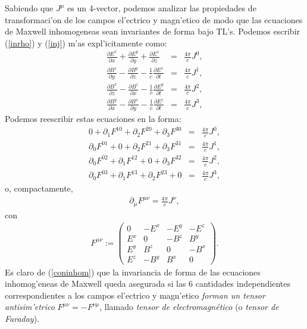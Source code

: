 Sabiendo que $J^\mu$ es un 4-vector, podemos analizar las propiedades de transformaci'on de los campos el'ectrico y magn'etico de modo que las ecuaciones de Maxwell inhomogeneas sean invariantes de forma bajo TL's. Podemos escribir (\ref{inrho}) y (\ref{inj})  m'as expl'icitamente
como:
\begin{eqnarray}
\frac{\partial E^x}{\partial x} + \frac{\partial E^y}{\partial y} +
\frac{\partial E^z}{\partial z} &=& \frac{4\pi}{c} J^0 , \\
\frac{\partial B^z}{\partial y} - \frac{\partial B^y}{\partial z} - \frac{1}{c}
\frac{\partial E^x}{\partial t} &=& \frac{4 \pi}{c} J^1 , \\
\frac{\partial B^x}{\partial z} - \frac{\partial B^z}{\partial x} - \frac{1}{c}
\frac{\partial E^y}{\partial t} &=& \frac{4 \pi}{c} J^2 , \\
\frac{\partial B^y}{\partial x} - \frac{\partial B^x}{\partial y} - \frac{1}{c}
\frac{\partial E^z}{\partial t} &=& \frac{4 \pi}{c} J^3 ,
\end{eqnarray}
Podemos reescribir estas ecuaciones en la forma:
\begin{eqnarray}
0 + \partial_1 F^{10} + \partial_2 F^{20} + \partial_3 F^{30} &=& \frac{4\pi}{c}
J^0 ,\\
\partial_0 F^{01} + 0+ \partial_2 F^{21} + \partial_3 F^{31} &=& \frac{4\pi}{c}
J^1 ,\\
\partial_0 F^{02} + \partial_1 F^{12} +0+ \partial_3 F^{32} &=& \frac{4\pi}{c}
J^2 ,\\
\partial_0 F^{03} + \partial_1 F^{13} + \partial_2 F^{23} +0&=& \frac{4\pi}{c}
J^3,
\end{eqnarray}
o, compactamente,
\begin{eqnarray}
\partial_\mu  F^{\mu \nu} = \frac{4\pi}{c} J^\nu  , \label{coninhom}
\end{eqnarray}
con
\begin{eqnarray}
F^{\mu \nu}:=
\left(
\begin{array}{cccc}
0&-E^x&-E^y&-E^z\\
E^x&0&-B^z&B^y\\
E^y&B^z&0&-B^x\\
E^z&-B^y&B^x&0
\end{array}
\right) . \label{Fupup}
\end{eqnarray}
Es claro de (\ref{coninhom}) que la invariancia de forma de las ecuaciones inhomog'eneas de Maxwell queda asegurada si las 6 cantidades independientes correspondientes a los campos el'ectrico y magn'etico \textit{forman un tensor antisim'etrico} $F^{\mu \nu}=-F^{\nu\mu}$, llamado \textit{tensor de electromagn\'etico} (o \textit{tensor de Faraday}).


